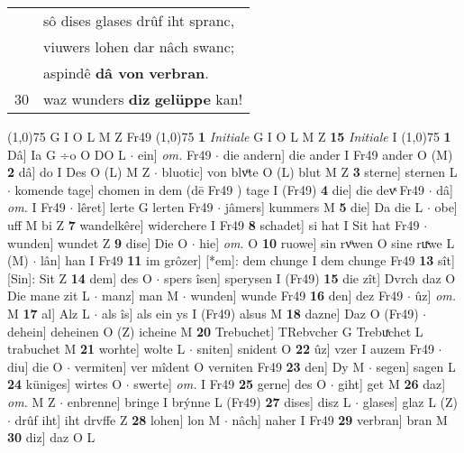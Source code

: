 \documentclass[8pt,a4paper,notitlepage]{article}
\begin{document}
\begin{table}[ht]
\begin{minipage}[t]{0.5\linewidth}
\begin{tabular}{rl}
 & sô dises glases drûf iht spranc,\\ 
 & viuwers lohen dar nâch swanc;\\ 
 & aspindê \textbf{dâ von} \textbf{verbran}.\\ 
30 & waz wunders \textbf{diz} \textbf{gelüppe} kan!\\ 
\end{tabular}
\scriptsize
\line(1,0){75} \newline
G I O L M Z Fr49 \newline
\line(1,0){75} \newline
\textbf{1} \textit{Initiale} G I O L M Z  \textbf{15} \textit{Initiale} I  \newline
\line(1,0){75} \newline
\textbf{1} Dâ] Ia G ÷o O DO L  $\cdot$ ein] \textit{om.} Fr49  $\cdot$ die andern] die ander I Fr49 ander O (M) \textbf{2} dâ] do I Des O (L) M Z  $\cdot$ bluotic] von blvͦte O (L) blut M Z \textbf{3} sterne] sternen L  $\cdot$ komende tage] chomen in dem (dē Fr49 ) tage I (Fr49) \textbf{4} die] die devͯ Fr49  $\cdot$ dâ] \textit{om.} I Fr49  $\cdot$ lêret] lerte G lerten Fr49  $\cdot$ jâmers] kummers M \textbf{5} die] Da die L  $\cdot$ obe] uff M bi Z \textbf{7} wandelkêre] widerchere I Fr49 \textbf{8} schadet] si hat I Sit hat Fr49  $\cdot$ wunden] wundet Z \textbf{9} dise] Die O  $\cdot$ hie] \textit{om.} O \textbf{10} ruowe] sin rvͦwen O sine ruͯwe L (M)  $\cdot$ lân] han I Fr49 \textbf{11} im grôzer] [*em]: dem chunge I dem chunge Fr49 \textbf{13} sît] [Sin]: Sit Z \textbf{14} dem] des O  $\cdot$ spers îsen] sperysen I (Fr49) \textbf{15} die zît] Dvrch daz O Die mane zit L  $\cdot$ manz] man M  $\cdot$ wunden] wunde Fr49 \textbf{16} den] dez Fr49  $\cdot$ ûz] \textit{om.} M \textbf{17} al] Alz L  $\cdot$ als îs] als ein ys I (Fr49) alsus M \textbf{18} dazne] Daz O (Fr49)  $\cdot$ dehein] deheinen O (Z) icheine M \textbf{20} Trebuchet] TRebvcher G Trebuͯchet L trabuchet M \textbf{21} worhte] wolte L  $\cdot$ sniten] snident O \textbf{22} ûz] vzer I auzem Fr49  $\cdot$ diu] die O  $\cdot$ vermiten] ver mîdent O verniten Fr49 \textbf{23} den] Dy M  $\cdot$ segen] sagen L \textbf{24} küniges] wirtes O  $\cdot$ swerte] \textit{om.} I Fr49 \textbf{25} gerne] des O  $\cdot$ giht] get M \textbf{26} daz] \textit{om.} M Z  $\cdot$ enbrenne] bringe I brýnne L (Fr49) \textbf{27} dises] disz L  $\cdot$ glases] glaz L (Z)  $\cdot$ drûf iht] iht drvffe Z \textbf{28} lohen] lon M  $\cdot$ nâch] naher I Fr49 \textbf{29} verbran] bran M \textbf{30} diz] daz O L \newline

\end{minipage}
\end{table}
\end{document}

